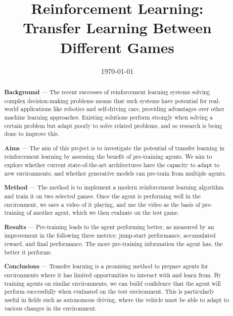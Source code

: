 \documentclass[12pt,a4paper]{article}
\title{Reinforcement Learning: \\Transfer Learning Between Different Games}
\author{} %
\date{\today}
\begin{document}
\maketitle

\begin{abstract}

\begin{flushleft} 
{\bf Background} --- The recent successes of reinforcement learning systems solving complex decision-making problems means that such systems have potential for real-world applications like robotics and self-driving cars, providing advantages over other machine learning approaches. Existing solutions perform strongly when solving a certain problem but adapt poorly to solve related problems, and so research is being done to improve this.
\end{flushleft}

\begin{flushleft}
{\bf Aims} --- The aim of this project is to investigate the potential of transfer learning in reinforcement learning by assessing the benefit of pre-training agents. We aim to explore whether current state-of-the-art architectures have the capacity to adapt to new environments, and whether generative models can pre-train from multiple agents.
\end{flushleft}

\begin{flushleft}
{\bf Method} --- The method is to implement a modern reinforcement learning algorithm and train it on two selected games. Once the agent is performing well in the environment, we save a video of it playing, and use the video as the basis of pre-training of another agent, which we then evaluate on the test game.    
\end{flushleft}

\begin{flushleft}
{\bf Results} --- Pre-training leads to the agent performing better, as measured by an improvement in the following three metrics: jump-start performance, accumulated reward, and final performance. The more pre-training information the agent has, the better it performs. 
\end{flushleft}

\begin{flushleft}
{\bf Conclusions} --- Transfer learning is a promising method to prepare agents for environments where it has limited opportunities to interact with and learn from. By training agents on similar environments, we can build confidence that the agent will perform successfully when evaluated on the test environment. This is particularly useful in fields such as autonomous driving, where the vehicle must be able to adapt to various changes in the environment.
\end{flushleft}

\end{abstract}
\end{document}
